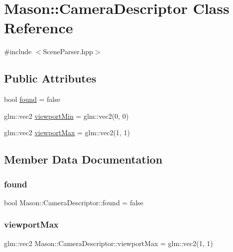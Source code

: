 \hypertarget{class_mason_1_1_camera_descriptor}{}\section{Mason\+:\+:Camera\+Descriptor Class Reference}
\label{class_mason_1_1_camera_descriptor}


{\ttfamily \#include $<$Scene\+Parser.\+hpp$>$}

\subsection*{Public Attributes}
\begin{DoxyCompactItemize}
\item 
bool \hyperlink{class_mason_1_1_camera_descriptor_a51ca9c821b638e93d9406d97a3d50041}{found} = false
\item 
glm\+::vec2 \hyperlink{class_mason_1_1_camera_descriptor_a2d135d0102e435f15cf6a9dde7d64b25}{viewport\+Min} = glm\+::vec2(0, 0)
\item 
glm\+::vec2 \hyperlink{class_mason_1_1_camera_descriptor_ac0a5eb6054280925fbda6a20bb56932d}{viewport\+Max} = glm\+::vec2(1, 1)
\end{DoxyCompactItemize}


\subsection{Member Data Documentation}
\hypertarget{class_mason_1_1_camera_descriptor_a51ca9c821b638e93d9406d97a3d50041}{}\label{class_mason_1_1_camera_descriptor_a51ca9c821b638e93d9406d97a3d50041} 
\subsubsection{\texorpdfstring{found}{found}}
{\footnotesize\ttfamily bool Mason\+::\+Camera\+Descriptor\+::found = false}

\hypertarget{class_mason_1_1_camera_descriptor_ac0a5eb6054280925fbda6a20bb56932d}{}\label{class_mason_1_1_camera_descriptor_ac0a5eb6054280925fbda6a20bb56932d} 
\subsubsection{\texorpdfstring{viewport\+Max}{viewportMax}}
{\footnotesize\ttfamily glm\+::vec2 Mason\+::\+Camera\+Descriptor\+::viewport\+Max = glm\+::vec2(1, 1)}

